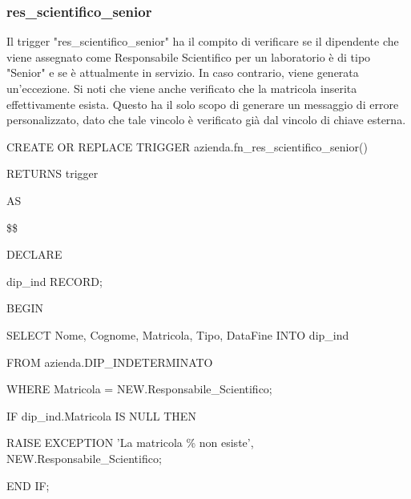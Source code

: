         \subsubsection{res\_scientifico\_senior}
        Il trigger "res\_scientifico\_senior" ha il compito di verificare se il dipendente che viene assegnato come Responsabile Scientifico per un laboratorio è di tipo "Senior" e se è attualmente in servizio. In caso contrario, viene generata un'eccezione. Si noti che viene anche verificato che la matricola inserita effettivamente esista. Questo ha il solo scopo di generare un messaggio di errore personalizzato, dato che tale vincolo è verificato già dal vincolo di chiave esterna.
        \ttfamily
            \begin{flushleft}
                \begin{description}
                    \item CREATE OR REPLACE TRIGGER azienda.fn\_res\_scientifico\_senior()  
                    \item RETURNS trigger
                    \item AS
                    \item \$\$
                    \item DECLARE
                    \begin{description}
                        \item dip\_ind RECORD;
                    \end{description}
                    \item BEGIN 
                    \begin{description}
                        \item SELECT Nome, Cognome, Matricola, Tipo, DataFine INTO dip\_ind
                        \item FROM azienda.DIP\_INDETERMINATO
                        \item WHERE Matricola = NEW.Responsabile\_Scientifico;
                        
                        \item IF dip\_ind.Matricola IS NULL THEN
                        \begin{description}
                            \item RAISE EXCEPTION 'La matricola \% non esiste', NEW.Responsabile\_Scientifico;
                        \end{description}
                        \item END IF;
                    

\end{description}
\end{description}
\end{flushleft}
